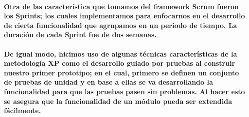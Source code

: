 \paragraph{Otra de las característica que tomamos del framework Scrum fueron los Sprints; los cuales implementamos para enfocarnos en el desarrollo de cierta funcionalidad que agrupamos en un periodo de tiempo. La duración de cada Sprint fue de dos semanas.}


\paragraph{De igual modo, hicimos uso de algunas técnicas características de la metodología XP como el desarrollo guiado por pruebas al construir nuestro primer prototipo; en el cual, primero se definen un conjunto de pruebas  de unidad y en base a ellas se va desarrollando la funcionalidad para que las pruebas pasen sin problemas. Al hacer esto se asegura que la funcionalidad de un módulo pueda ser extendida fácilmente.}
